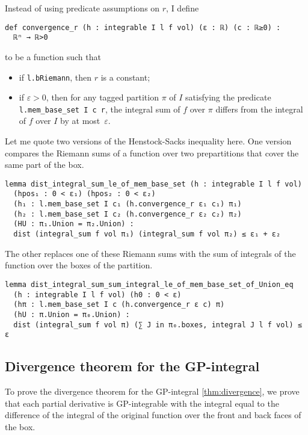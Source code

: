 \documentclass[a4paper,UKenglish,cleveref, autoref, thm-restate]{lipics-v2021}
\newcommand{\eps}{\varepsilon}
\begin{document}
Instead of using predicate assumptions on \(r\), I define
\begin{lstlisting}
def convergence_r (h : integrable I l f vol) (ε : ℝ) (c : ℝ≥0) :
  ℝⁿ → ℝ>0
\end{lstlisting}
to be a function such that
\begin{itemize}
\item if \lstinline=l.bRiemann=, then \(r\) is a constant;
\item if \(\eps > 0\), then for any tagged partition \(\pi\) of \(I\)
  satisfying the predicate \lstinline=l.mem_base_set I c r=, the
  integral sum of \(f\) over \(\pi\) differs from the integral of
  \(f\) over \(I\) by at most~\(\eps\).
\end{itemize}

Let me quote two versions of the Henstock-Sacks inequality here. One
version compares the Riemann sums of a function over two prepartitions
that cover the same part of the box.
\begin{lstlisting}
lemma dist_integral_sum_le_of_mem_base_set (h : integrable I l f vol)
  (hpos₁ : 0 < ε₁) (hpos₂ : 0 < ε₂)
  (h₁ : l.mem_base_set I c₁ (h.convergence_r ε₁ c₁) π₁)
  (h₂ : l.mem_base_set I c₂ (h.convergence_r ε₂ c₂) π₂)
  (HU : π₁.Union = π₂.Union) :
  dist (integral_sum f vol π₁) (integral_sum f vol π₂) ≤ ε₁ + ε₂
\end{lstlisting}

The other replaces one of these Riemann sums with the sum of integrals
of the function over the boxes of the partition.

\begin{lstlisting}
lemma dist_integral_sum_sum_integral_le_of_mem_base_set_of_Union_eq
  (h : integrable I l f vol) (h0 : 0 < ε)
  (hπ : l.mem_base_set I c (h.convergence_r ε c) π)
  (hU : π.Union = π₀.Union) :
  dist (integral_sum f vol π) (∑ J in π₀.boxes, integral J l f vol) ≤ ε
\end{lstlisting}

\subsection{Divergence theorem for the GP-integral}%
\label{sec:diverg-theor-gp}

To prove the divergence theorem for the GP-integral
\autoref{thm:divergence}, we prove that each partial derivative is
GP-integrable with the integral equal to the difference of the
integral of the original function over the front and back faces of the
box.
\end{document}
